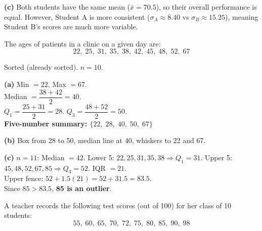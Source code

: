 \documentclass[addpoints]{exam}
\begin{document}
\begin{questions}
\begin{solution}[9cm]
\textbf{(c)} Both students have the same mean ($\bar{x} = 70.5$), so their overall performance is
equal. However, Student A is more consistent ($\sigma_A \approx 8.40$ vs $\sigma_B \approx 15.25$),
meaning Student B's scores are much more variable.
\end{solution}

\question The ages of patients in a clinic on a given day are:
\[22,\; 25,\; 31,\; 35,\; 38,\; 42,\; 45,\; 48,\; 52,\; 67\]
\begin{solution}[9cm]
Sorted (already sorted). $n = 10$.

\textbf{(a)} Min $= 22$, Max $= 67$.\\
Median $= \dfrac{38+42}{2} = 40$.\\
$Q_1 = \dfrac{25+31}{2} = 28$. \quad $Q_3 = \dfrac{48+52}{2} = 50$.\\
\textbf{Five-number summary: $\{22,\; 28,\; 40,\; 50,\; 67\}$}

\textbf{(b)} Box from 28 to 50, median line at 40, whiskers to 22 and 67.

\textbf{(c)} $n=11$: Median $= 42$. Lower 5: $22,25,31,35,38\Rightarrow Q_1=31$.
Upper 5: $45,48,52,67,85\Rightarrow Q_3=52$. IQR $= 21$.\\
Upper fence: $52 + 1.5(21) = 52 + 31.5 = 83.5$.\\
Since $85 > 83.5$, \textbf{85 is an outlier}.
\end{solution}

\question A teacher records the following test scores (out of 100) for her class of 10 students:
\[55,\; 60,\; 65,\; 70,\; 72,\; 75,\; 80,\; 85,\; 90,\; 98\]
\end{questions}
\end{document}
